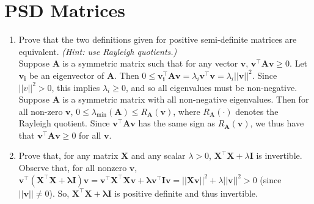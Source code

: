 \documentclass{article}
\begin{document}
\section{PSD Matrices}
\begin{enumerate}[label=\arabic*.]
\item Prove that the two definitions given for positive semi-definite matrices are equivalent. \textit{(Hint: use Rayleigh quotients.)} \\
{\color{blue} Suppose $\mathbf{A}$ is a symmetric matrix such that for any vector $\mathbf{v}$, $\mathbf{v^{\top}Av} \geq 0$. Let $\mathbf{v_i}$ be an eigenvector of $\mathbf{A}$. Then $0 \leq \mathbf{v_i^{\top}Av} = \lambda_i\mathbf{v^{\top}v} = \lambda_i ||\mathbf{v}||^2$. Since $||v||^2 > 0$, this implies $\lambda_i \geq 0$, and so all eigenvalues must be non-negative. \\
Suppose $\mathbf{A}$ is a symmetric matrix with all non-negative eigenvalues. Then for all non-zero $\mathbf{v}$, $0 \leq \lambda_{\min}(\mathbf{A}) \leq R_{\mathbf{A}}(\mathbf{v})$, where $R_{\mathbf{A}}(\cdot)$ denotes the Rayleigh quotient. Since $\mathbf{v^{\top}Av}$ has the same sign as $R_{\mathbf{A}}(\mathbf{v})$, we thus have that $\mathbf{v^{\top}Av} \geq 0$ for all $\mathbf{v}$.} 
\item Prove that, for any matrix $\mathbf{X}$ and any scalar $\lambda > 0$, $\mathbf{X^{\top}X} + \lambda\mathbf{I}$ is invertible. \\
{\color{blue} Observe that, for all nonzero $\mathbf{v}$, $\mathbf{v^{\top}(X^{\top}X + \lambda I)v} = \mathbf{v^{\top}X^{\top}Xv + \lambda v^{\top}Iv} = ||\mathbf{Xv}||^2 + \lambda ||\mathbf{v}||^2 > 0$ (since $||\mathbf{v}|| \neq 0$). So, $\mathbf{X^{\top}X + \lambda I}$ is positive definite and thus invertible.}
\end{enumerate}
\end{document}
